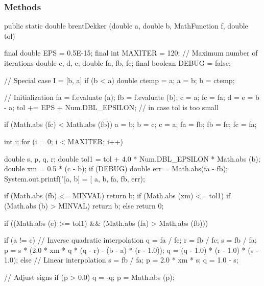 \subsubsection* {Methods}
\begin{code}

   public static double brentDekker (double a, double b,
                                     MathFunction f, double tol)\begin{hide} {
      final double EPS = 0.5E-15;
      final int MAXITER = 120;    // Maximum number of iterations
      double c, d, e;
      double fa, fb, fc;
      final boolean DEBUG = false;

      // Special case I = [b, a]
      if (b < a) {
         double ctemp = a;
         a = b;
         b = ctemp;
      }

      // Initialization
      fa = f.evaluate (a);
      fb = f.evaluate (b);
      c = a;
      fc = fa;
      d = e = b - a;
      tol += EPS + Num.DBL_EPSILON; // in case tol is too small

      if (Math.abs (fc) < Math.abs (fb)) {
         a = b;
         b = c;
         c = a;
         fa = fb;
         fb = fc;
         fc = fa;
      }

      int i;
      for (i = 0; i < MAXITER; i++) {
         double s, p, q, r;
         double tol1 = tol + 4.0 * Num.DBL_EPSILON * Math.abs (b);
         double xm = 0.5 * (c - b);
         if (DEBUG) {
            double err = Math.abs(fa - fb);
            System.out.printf("[a, b] = [%
                    a, b, fa, fb, err);
         }

         if (Math.abs (fb) <= MINVAL) {
            return b;
         }
         if (Math.abs (xm) <= tol1) {
            if (Math.abs (b) > MINVAL)
               return b;
            else
               return 0;
         }

         if ((Math.abs (e) >= tol1) && (Math.abs (fa) > Math.abs (fb))) {
            if (a != c) {
               // Inverse quadratic interpolation
               q = fa / fc;
               r = fb / fc;
               s = fb / fa;
               p = s * (2.0 * xm * q * (q - r) - (b - a) * (r - 1.0));
               q = (q - 1.0) * (r - 1.0) * (s - 1.0);
            } else {
               // Linear interpolation
               s = fb / fa;
               p = 2.0 * xm * s;
               q = 1.0 - s;
            }

            // Adjust signs
            if (p > 0.0)
               q = -q;
            p = Math.abs (p);

}}}
\end{hide}
\end{code}
